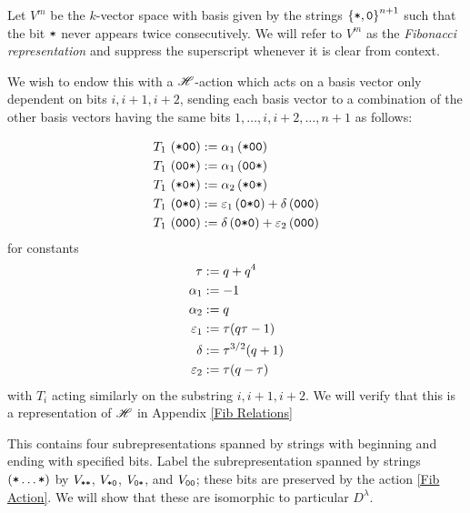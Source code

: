 \documentclass{amsart}
\begin{document}
  \begin{definition}
  Let $V^m$ be the $k$-vector space with basis given by the strings $\left\{ \texttt{*},\texttt{0} \right\}^{n+1}$ such that the bit $\texttt{*}$ never appears twice consecutively. 
  We will refer to $V^m$ as the \emph{Fibonacci representation} and suppress the superscript whenever it is clear from context.

  We wish to endow this with a $\mathscr{H}$-action which acts on a basis vector only dependent on bits $i,i+1,i+2$, sending each basis vector to a combination of the other basis vectors having the same bits $1,\dots,i,i+2,\dots,n+1$ as follows:

  \begin{equation} 
    \begin{split}
      T_1 \, \left( \texttt{*}\texttt{0}\texttt{0} \right) &:= \alpha_1\left( \texttt{*}\texttt{0}\texttt{0} \right)\\
      T_1 \, \left( \texttt{0}\texttt{0}\texttt{*} \right) &:= \alpha_1\left( \texttt{0}\texttt{0}\texttt{*} \right)\\
      T_1 \, \left( \texttt{*}\texttt{0}\texttt{*} \right) &:= \alpha_2\left( \texttt{*}\texttt{0}\texttt{*} \right)\\
      T_1 \, \left( \texttt{0}\texttt{*}\texttt{0} \right) &:= \varepsilon_1\left( \texttt{0}\texttt{*}\texttt{0} \right) + \delta\left( \texttt{0}\texttt{0}\texttt{0} \right)\\
      T_1 \, \left( \texttt{0}\texttt{0}\texttt{0} \right) &:= \delta\left( \texttt{0}\texttt{*}\texttt{0} \right) + \varepsilon_2\left( \texttt{0}\texttt{0}\texttt{0} \right)
  \end{split} \label{Fib Action} 
  \end{equation}
  for constants
  \begin{equation}
    \begin{split}
    \tau  &:= q + q^4\\
    \alpha_1 &:= -1\\
    \alpha_2 &:= q\\
    \varepsilon_1 &:= \tau(q\tau - 1)\\
    \delta &:= \tau^{3/2}(q + 1)\\
    \varepsilon_2 &:= \tau(q-\tau)
  \end{split} \label{Fib Constants} 
  \end{equation}
  with $T_i$ acting similarly on the substring $i,i+1,i+2$.
  We will verify that this is a representation of $\mathscr{H}$ in Appendix \ref{Fib Relations}
  \end{definition}

  This contains four subrepresentations spanned by strings with beginning and ending with specified bits.
  Label the subrepresentation spanned by strings $(\texttt{*}\dots\texttt{*})$ by $V_{\texttt{*}\texttt{*}}$, $V_{\texttt{*}\texttt{0}}$, $V_{\texttt{0}\texttt{*}}$, and $V_{\texttt{0}\texttt{0}}$;
  these bits are preserved by the action \eqref{Fib Action}.
  We will show that these are isomorphic to particular $D^\lambda$.
\end{document}
